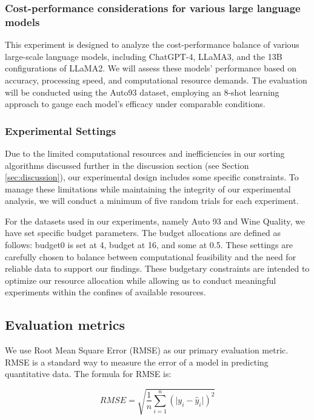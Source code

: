 \documentclass{ieeeaccess}
\begin{document}
        \subsubsection{Cost-performance considerations for various large language models}
        
        This experiment is designed to analyze the cost-performance balance of various large-scale language models, including ChatGPT-4, LLaMA3, and the 13B configurations of LLaMA2. We will assess these models' performance based on accuracy, processing speed, and computational resource demands. The evaluation will be conducted using the Auto93 dataset, employing an 8-shot learning approach to gauge each model's efficacy under comparable conditions.

        \subsubsection{Experimental Settings}

        Due to the limited computational resources and inefficiencies in our sorting algorithms discussed further in the discussion section (see Section \ref{sec:discussion}), our experimental design includes some specific constraints. To manage these limitations while maintaining the integrity of our experimental analysis, we will conduct a minimum of five random trials for each experiment.

        For the datasets used in our experiments, namely Auto 93 and Wine Quality, we have set specific budget parameters. The budget allocations are defined as follows: budget0 is set at 4, budget at 16, and some at 0.5. These settings are carefully chosen to balance between computational feasibility and the need for reliable data to support our findings. These budgetary constraints are intended to optimize our resource allocation while allowing us to conduct meaningful experiments within the confines of available resources.



\subsection{Evaluation metrics}
We use Root Mean Square Error (RMSE) as our primary evaluation metric. RMSE is a standard way to measure the error of a model in predicting quantitative data. The formula for RMSE is:

\begin{equation}
    RMSE = \sqrt{\frac{1}{n}\sum_{i=1}^{n}(\lvert y_i - \hat{y}_i \rvert )^2}
\end{equation}
\end{document}
